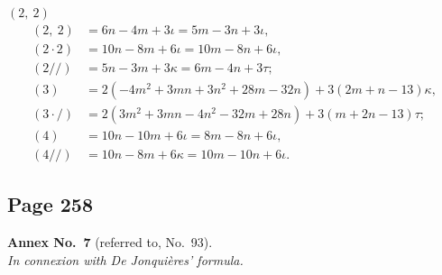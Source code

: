 \documentclass[11pt,a4paper]{article}
\theoremstyle{definition}
\begin{document}
\noindent$(2,\ 2)$
\begin{align*}
(2,\ 2) &= 6n - 4m + 3\iota = 5m - 3n + 3\iota,\\
(2 \cdot 2) &= 10n - 8m + 6\iota = 10m - 8n + 6\iota,\\
(2 //) &= 5n - 3m + 3\kappa = 6m - 4n + 3\tau;\\
(3) &= 2(-4m^2 + 3mn + 3n^2 + 28m - 32n) + 3(2m + n - 13)\kappa,\\
(3 \cdot /) &= 2(3m^2 + 3mn - 4n^2 - 32m + 28n) + 3(m + 2n - 13)\tau;\\
(4) &= 10n - 10m + 6\iota = 8m - 8n + 6\iota,\\
(4 //) &= 10n - 8m + 6\kappa = 10m - 10n + 6\iota.
\end{align*}

\subsection*{Page 258}

\noindent\textbf{Annex No.~7} (referred to, No.~93).\\
\textit{In connexion with De Jonqui\`eres' formula.}
\end{document}
